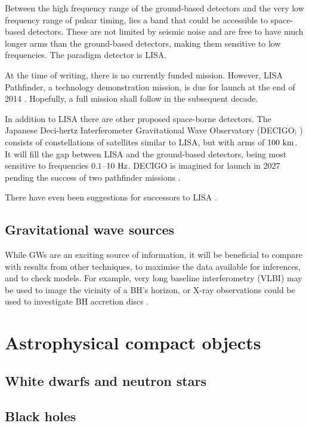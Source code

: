 {Between the high frequency range of the ground-based detectors and the very low frequency range of pulsar timing, lies a band that could be accessible to space-based detectors. These are not limited by seismic noise and are free to have much longer arms than the ground-based detectors, making them sensitive to low frequencies. The paradigm detector is LISA. 

At the time of writing, there is no currently funded mission. However, LISA Pathfinder, a technology demonstration mission, is due for launch at the end of 2014 \citep{Anza2005, Antonucci2012}. Hopefully, a full mission shall follow in the subsequent decade.

In addition to LISA there are other proposed space-borne detectors. The Japanese Deci-hertz Interferometer Gravitational Wave Observatory (DECIGO; \citealt{Kawamura2006,Kawamura2011}) consists of constellations of satellites similar to LISA, but with arms of $100~\mathrm{km}$. It will fill the gap between LISA and the ground-based detectors, being most sensitive to frequencies $0.1$--$10~\mathrm{Hz}$. DECIGO is imagined for launch in 2027 pending the success of two pathfinder missions \citep{Ando2010}.

There have even been suggestions for successors to LISA \citep{Crowder2005}.

\subsection{Gravitational wave sources}

While GWs are an exciting source of information, it will be beneficial to compare with results from other techniques, to maximise the data available for inferences, and to check models. For example, very long baseline interferometry (VLBI) may be used to image the vicinity of a BH's horizon, or X-ray observations could be used to investigate BH accretion discs \cite{Psaltis2008}.

\section{Astrophysical compact objects}

\subsection{White dwarfs and neutron stars}

\subsection{Black holes}

}
